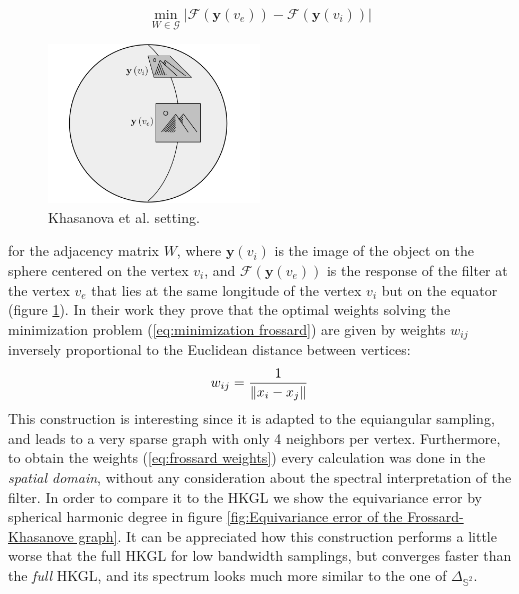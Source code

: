 \begin{equation}\label{eq:minimization frossard}
	\min_{W\in\mathcal G} \left|\mathcal{F}\left(\mathbf{y}\left(v_{ e}\right)\right)-\mathcal{F}\left(\mathbf{y}\left(v_{ i}\right)\right)\right|
\end{equation}
\begin{figure}
	\begin{center}
		\includegraphics[width=0.5\textwidth]{figs/Chapter3/frossard2.png}
	\end{center}
	\caption{\label{fig:frossard2}Khasanova et al. setting.}
\end{figure}
for the adjacency matrix $W$, where $\mathbf y(v_i)$ is the image of the object on the sphere centered on the vertex $v_i$, and $\mathcal F (\mathbf y(v_e))$ is the response of the filter at the vertex $v_e$ that lies at the same longitude of the vertex $v_i$ but on the equator (figure \ref{fig:frossard2}). In their work they prove that the optimal weights solving the minimization problem (\ref{eq:minimization frossard}) are given by weights $w_{ij}$ inversely proportional to the Euclidean distance between vertices:
\begin{equation}\label{eq:frossard weights}
	w_{ij} = \frac{1}{\left\lVert x_i-x_j\right\rVert}
\end{equation}
This construction is interesting since it is adapted to the equiangular sampling, and leads to a very sparse graph with only 4 neighbors per vertex. Furthermore, to obtain the weights (\ref{eq:frossard weights}) every calculation was done in the \textit{spatial domain}, without any consideration about the spectral interpretation of the filter. In order to compare it to the HKGL we show the equivariance error by spherical harmonic degree in figure \ref{fig:Equivariance error of the Frossard-Khasanove graph}. It can be appreciated how this construction performs a little worse that the full HKGL for low bandwidth samplings, but converges faster than the \textit{full} HKGL, and its spectrum looks much more similar to the one of $\Delta_{\mathbb S^2}$.

